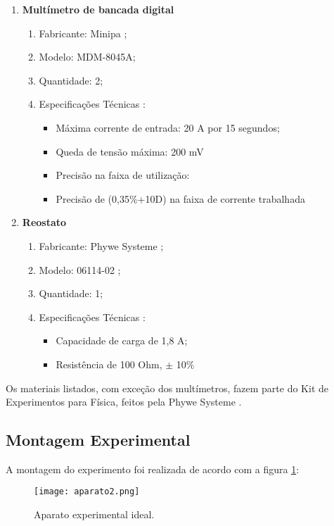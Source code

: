 \documentclass[reprint,amsmath,amssymb,aps]{revtex4-2}
\begin{document}
\begin{enumerate}
    \item \textbf{Multímetro de bancada digital}
    \begin{enumerate}
        \item Fabricante: Minipa \textregistered;
        \item Modelo: MDM-8045A; 
        \item Quantidade: 2;
        \item Especificações Técnicas \cite{multimetro}:
        \begin{itemize}
            \item Máxima corrente de entrada: 20 A por 15 segundos;
            \item Queda de tensão máxima: 200 mV
            \item Precisão na faixa de utilização:
        \item Precisão de (0,35\%+10D) na faixa de corrente trabalhada
        \end{itemize}
    \end{enumerate}
         \item \textbf{Reostato}
          \begin{enumerate}
        \item Fabricante:  Phywe Systeme \textregistered;
        \item Modelo: 06114-02 ; 
        \item Quantidade: 1;
        \item Especificações Técnicas \cite{reostato}:
        \begin{itemize}
            \item Capacidade de carga de 1,8 A;
            \item Resistência de 100 Ohm, $\pm$ 10\%
                    \end{itemize}
    \end{enumerate}
\end{enumerate}
       
Os materiais listados, com exceção dos multímetros, fazem parte do Kit de Experimentos para Física, feitos pela Phywe Systeme \textregistered.

\subsection{Montagem Experimental}
A montagem do experimento foi realizada de acordo com a figura \ref{pardebobinas}:

\begin{figure}[H]
\centering
\texttt{[image: aparato2.png]}%
\caption{\label{pardebobinas} Aparato experimental ideal.}
\end{figure}
\end{document}
